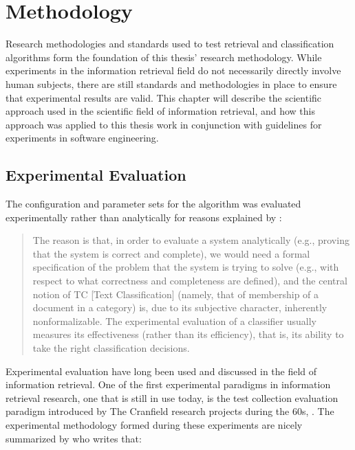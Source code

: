 
\chapter{Methodology} %

\label{Methodology} %


Research methodologies and standards used to test retrieval and classification algorithms form the foundation of this thesis' research methodology. While experiments in the information retrieval field do not necessarily directly involve human subjects, there are still standards and methodologies in place to ensure that experimental results are valid. This chapter will describe the scientific approach used in the scientific field of information retrieval, and how this approach was applied to this thesis work in conjunction with guidelines for experiments in software engineering.

\section{Experimental Evaluation}
\label{ExperimentalEvaluation}
The configuration and parameter sets for the \CTC algorithm was evaluated experimentally rather than analytically for reasons explained by \cite[][32]{Sebastiani2002}:
\begin{quote}The reason is that, in order to evaluate a system analytically (e.g., proving that the system is correct and complete), we would need a formal specification of the problem that the system is trying to solve (e.g., with respect to what correctness and completeness are defined), and the central notion of TC [Text Classification] (namely, that of membership of a document in a category) is, due to its subjective character, inherently nonformalizable. The experimental evaluation of a classifier usually measures its effectiveness (rather than its efficiency), that is, its ability to take the right classification decisions.
\end{quote}

Experimental evaluation have long been used and discussed in the field of information retrieval. One of the first experimental paradigms in information retrieval research, one that is still in use today, is the test collection evaluation paradigm introduced by The Cranfield research projects during the 60s, \cite{Cleverdon1966}. The experimental methodology formed during these experiments are nicely summarized by \cite[][564]{Voorhees2005} who writes that:


